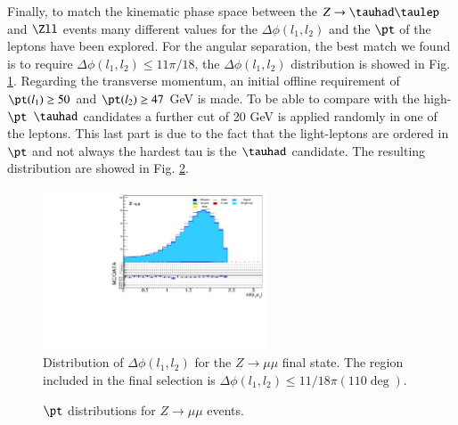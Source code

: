 Finally, to match the kinematic phase space between the $Z\to\tauhad\taulep$ and $\Zll$ events many different values for the $\Delta\phi (l_1,l_2)$ and the $\pt$ of the leptons have been explored. For the angular separation, the best match we found is to require $\Delta\phi (l_1,l_2)\leq 11\pi/18$, the $\Delta\phi (l_1,l_2)$ distribution is showed in Fig. \ref{Fig8s}. Regarding the transverse momentum, an initial offline requirement of $\pt(l_1)\geq 50$ and $\pt(l_2)\geq 47$ GeV is made. To be able to compare with the high-$\pt$ $\tauhad$ candidates a further cut of 20 GeV is applied randomly in one of the leptons. This last part is due to the fact that the light-leptons are ordered in $\pt$ and not always the hardest tau is the $\tauhad$ candidate. The resulting distribution are showed in Fig. \ref{Fig9}.
\begin{figure}[htbp]
	\centering
	\includegraphics[width=0.6\textwidth]{figures/Fig8.pdf}
	\caption{Distribution of $\Delta\phi (l_1,l_2)$ for the $Z\to\mu\mu$ final state. The region included in the final selection is $\Delta\phi (l_1,l_2)\leq 11/18\pi (110\deg)$.}
	\label{Fig8s}
\end{figure}
\begin{figure}[htbp]
	\centering
	\hfill
	\caption{$\pt$ distributions for $Z\to\mu\mu$ events.}
	\label{Fig9}
\end{figure}